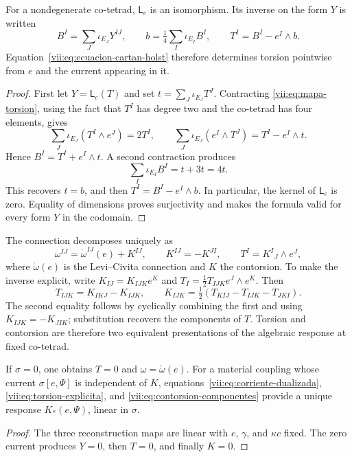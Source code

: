 \begin{theorem}
\label{vii:thm:inversion-torsion}
For a nondegenerate co-tetrad, \(\mathsf L_e\) is an isomorphism.
Its inverse on the form \(Y\) is written
\begin{equation}
 B^I=\sum_J\iota_{E_J}Y^{IJ},\qquad
 b=\tfrac14\sum_I\iota_{E_I}B^I,\qquad
 T^I=B^I-e^I\wedge b.
 \label{vii:eq:torsion-explicita}
\end{equation}
Equation~\eqref{vii:eq:ecuacion-cartan-holst} therefore determines
torsion pointwise from \(e\) and the current appearing
in it.
\end{theorem}
\begin{proof}
First let \(Y=\mathsf L_e(T)\) and set
\(t=\sum_J\iota_{E_J}T^J\). Contracting
\eqref{vii:eq:mapa-torsion}, using the fact that \(T^I\) has degree two
and the co-tetrad has four elements, gives
\[
 \sum_J\iota_{E_J}(T^I\wedge e^J)=2T^I,
 \qquad
 \sum_J\iota_{E_J}(e^I\wedge T^J)=T^I-e^I\wedge t.
\]
Hence \(B^I=T^I+e^I\wedge t\). A second contraction produces
\[
 \sum_I\iota_{E_I}B^I=t+3t=4t.
\]
This recovers \(t=b\), and then \(T^I=B^I-e^I\wedge b\).
In particular, the kernel of \(\mathsf L_e\) is zero. Equality
of dimensions proves surjectivity and makes the formula valid
for every form \(Y\) in the codomain.
\end{proof}

The connection decomposes uniquely as
\begin{equation}
 \omega^{IJ}=\mathring\omega^{IJ}(e)+K^{IJ},\qquad
 K^{IJ}=-K^{JI},\qquad T^I=K^I{}_{J}\wedge e^J,
 \label{vii:eq:contorsion}
\end{equation}
where \(\mathring\omega(e)\) is the Levi--Civita connection and
\(K\) the contorsion. To make the inverse explicit, write
\(K_{IJ}=K_{IJK}e^K\) and
\(T_I=\tfrac12T_{IJK}e^J\wedge e^K\). Then
\begin{equation}
 T_{IJK}=K_{IKJ}-K_{IJK},\qquad
 K_{IJK}=\tfrac12(T_{KIJ}-T_{IJK}-T_{JKI}).
 \label{vii:eq:contorsion-componentes}
\end{equation}
The second equality follows by cyclically combining the first and
using \(K_{IJK}=-K_{JIK}\); substitution recovers the components
of \(T\). Torsion and contorsion are therefore two
equivalent presentations of the algebraic response at fixed co-tetrad.

\begin{corollary}
\label{vii:cor:desacoplamiento-torsional}
If \(\sigma=0\), one obtains \(T=0\) and
\(\omega=\mathring\omega(e)\). For a material coupling whose
current \(\sigma[e,\Psi]\) is independent of \(K\),
equations~\eqref{vii:eq:corriente-dualizada},
\eqref{vii:eq:torsion-explicita}, and
\eqref{vii:eq:contorsion-componentes} provide a unique response
\(K_*(e,\Psi)\), linear in \(\sigma\).
\end{corollary}
\begin{proof}
The three reconstruction maps are linear with \(e\),
\(\gamma\), and \(\kappa c\) fixed. The zero current produces
\(Y=0\), then \(T=0\), and finally \(K=0\).
\end{proof}

